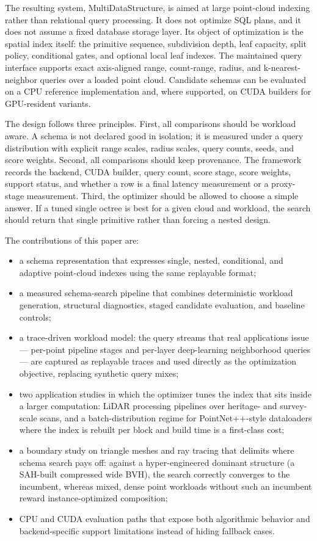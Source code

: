 The resulting system, MultiDataStructure, is aimed at large point-cloud indexing rather than relational query processing. It does not optimize SQL plans, and it does not assume a fixed database storage layer. Its object of optimization is the spatial index itself: the primitive sequence, subdivision depth, leaf capacity, split policy, conditional gates, and optional local leaf indexes. The maintained query interface supports exact axis-aligned range, count-range, radius, and k-nearest-neighbor queries over a loaded point cloud. Candidate schemas can be evaluated on a CPU reference implementation and, where supported, on CUDA builders for GPU-resident variants.

The design follows three principles. First, all comparisons should be workload aware. A schema is not declared good in isolation; it is measured under a query distribution with explicit range scales, radius scales, query counts, seeds, and score weights. Second, all comparisons should keep provenance. The framework records the backend, CUDA builder, query count, score stage, score weights, support status, and whether a row is a final latency measurement or a proxy-stage measurement. Third, the optimizer should be allowed to choose a simple answer. If a tuned single octree is best for a given cloud and workload, the search should return that single primitive rather than forcing a nested design.

The contributions of this paper are:
\begin{itemize}[leftmargin=*]
  \item a schema representation that expresses single, nested, conditional, and adaptive point-cloud indexes using the same replayable format;
  \item a measured schema-search pipeline that combines deterministic workload generation, structural diagnostics, staged candidate evaluation, and baseline controls;
  \item a trace-driven workload model: the query streams that real applications issue --- per-point pipeline stages and per-layer deep-learning neighborhood queries --- are captured as replayable traces and used directly as the optimization objective, replacing synthetic query mixes;
  \item two application studies in which the optimizer tunes the index that sits inside a larger computation: LiDAR processing pipelines over heritage- and survey-scale scans, and a batch-distribution regime for PointNet++-style dataloaders where the index is rebuilt per block and build time is a first-class cost;
  \item a boundary study on triangle meshes and ray tracing that delimits where schema search pays off: against a hyper-engineered dominant structure (a SAH-built compressed wide BVH), the search correctly converges to the incumbent, whereas mixed, dense point workloads without such an incumbent reward instance-optimized composition;
  \item CPU and CUDA evaluation paths that expose both algorithmic behavior and backend-specific support limitations instead of hiding fallback cases.
\end{itemize}

